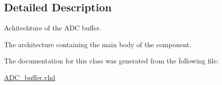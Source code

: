 \subsection{Detailed Description}
Achitechture of the A\-D\-C buffer. 

The architecture containing the main body of the component. 

The documentation for this class was generated from the following file\-:\begin{DoxyCompactItemize}
\item 
\hyperlink{ADC__buffer_8vhd}{A\-D\-C\-\_\-buffer.\-vhd}\end{DoxyCompactItemize}
